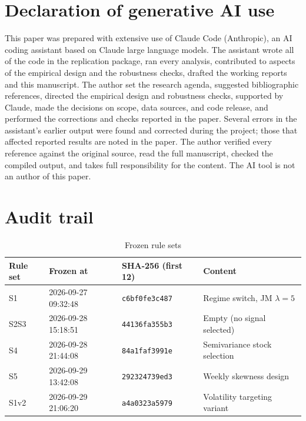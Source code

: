 \documentclass[11pt]{article}
\begin{document}
\section*{Declaration of generative AI use}

This paper was prepared with extensive use of Claude Code (Anthropic), an AI coding assistant based on Claude large language models. The assistant wrote all of the code in the replication package, ran every analysis, contributed to aspects of the empirical design and the robustness checks, drafted the working reports and this manuscript. The author set the research agenda, suggested bibliographic references, directed the empirical design and robustness checks, supported by Claude, made the decisions on scope, data sources, and code release, and performed the corrections and checks reported in the paper. Several errors in the assistant's earlier output were found and corrected during the project; those that affected reported results are noted in the paper. The author verified every reference against the original source, read the full manuscript, checked the compiled output, and takes full responsibility for the content. The AI tool is not an author of this paper.




\clearpage
\appendix

\section{Audit trail}\label{app:audit}

\begin{table}[!htbp]
\centering
\caption{Frozen rule sets}\label{tab:frozen}
\small
\begin{tabular}{llll}
\toprule 
Rule set & Frozen at & SHA-256 (first 12) & Content \\
\midrule
S1 & 2026-09-27 09:32:48 & \texttt{c6bf0fe3c487} & Regime switch, JM $\lambda=5$ \\
S2S3 & 2026-09-28 15:18:51 & \texttt{44136fa355b3} & Empty (no signal selected) \\
S4 & 2026-09-28 21:44:08 & \texttt{84a1faf3991e} & Semivariance stock selection \\
S5 & 2026-09-29 13:42:08 & \texttt{292324739ed3} & Weekly skewness design \\
S1v2 & 2026-09-29 21:06:20 & \texttt{a4a0323a5979} & Volatility targeting variant \\
\bottomrule
\end{tabular}
\end{table}
\end{document}
